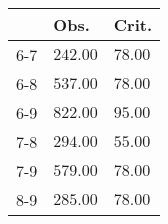 \begin{table}[ht]
\centering
\begin{tabular}{rll}
  \hline
 & Obs. & Crit. \\ 
  \hline
6-7 & \(\mathbf{242.00}\) & \(\mathbf{78.00}\) \\ 
  6-8 & \(\mathbf{537.00}\) & \(\mathbf{78.00}\) \\ 
  6-9 & \(\mathbf{822.00}\) & \(\mathbf{95.00}\) \\ 
  7-8 & \(\mathbf{294.00}\) & \(\mathbf{55.00}\) \\ 
  7-9 & \(\mathbf{579.00}\) & \(\mathbf{78.00}\) \\ 
  8-9 & \(\mathbf{285.00}\) & \(\mathbf{78.00}\) \\ 
   \hline
\end{tabular}
\end{table}
